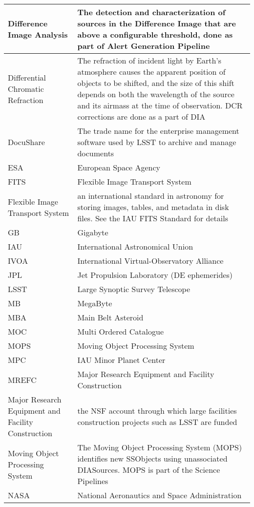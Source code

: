 \begin{longtable}{|p{}|p{}|}
Difference Image Analysis & The detection and characterization of sources in the \gls{Difference Image} that are above a configurable threshold, done as part of \gls{Alert} Generation Pipeline \\\hline
Differential Chromatic Refraction & The refraction of incident light by Earth's atmosphere causes the apparent position of objects to be shifted, and the size of this shift depends on both the wavelength of the source and its \gls{airmass} at the time of observation. \gls{DCR} corrections are done as a part of \gls{DIA} \\\hline
DocuShare & The trade name for the enterprise management software used by \gls{LSST} to archive and manage documents \\\hline
ESA & European Space Agency \\\hline
FITS & \gls{Flexible Image Transport System} \\\hline
Flexible Image Transport System & an international standard in astronomy for storing images, tables, and \gls{metadata} in disk files. See the \gls{IAU} \gls{FITS} Standard for details \\\hline
GB & Gigabyte \\\hline
IAU & International Astronomical Union \\\hline
IVOA & International Virtual-Observatory Alliance \\\hline
JPL & Jet Propulsion Laboratory (DE ephemerides) \\\hline
LSST & Large Synoptic Survey Telescope \\\hline
MB & MegaByte \\\hline
MBA & Main Belt Asteroid \\\hline
MOC & Multi Ordered Catalogue \\\hline
MOPS & Moving \gls{Object} Processing System \\\hline
MPC & \gls{IAU} Minor Planet \gls{Center} \\\hline
MREFC & Major Research Equipment and Facility \gls{Construction} \\\hline
Major Research Equipment and Facility \gls{Construction} & the \gls{NSF} account through which large facilities construction projects such as \gls{LSST} are funded \\\hline
Moving \gls{Object} Processing System & The Moving \gls{Object} Processing System (\gls{MOPS}) identifies new SSObjects using unassociated DIASources. \gls{MOPS} is part of the \gls{Science Pipelines} \\\hline
NASA & National Aeronautics and Space Administration \\\hline

\end{longtable}
